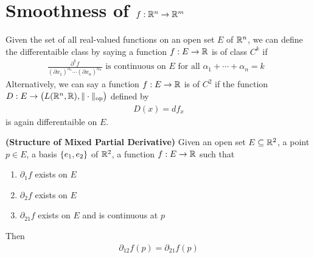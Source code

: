 \documentclass{report}
\begin{document}
\section{Smoothness of $f:\mathbb{R}^n\rightarrow \mathbb{R}^m$}
\begin{mdframed}
Given the set of all real-valued functions on an open set $E$ of $\mathbb{R}^n$, we can define the differentaible class by saying a function $f:E\rightarrow \mathbb{R}$ is of class $C^k$ if 
\begin{align*}
\frac{\partial^kf}{(\partial x_1)^{\alpha_1}\cdots (\partial x_n)^{\alpha_n}}\text{ is continuous on $E$ for all $\alpha_1+\cdots + \alpha_n=k$  }
\end{align*}
Alternatively, we can say a function $f:E\rightarrow \mathbb{R}$ is of $C^2$ if the function $D:E\rightarrow \big(L(\mathbb{R}^n,\mathbb{R}),\| \cdot \|_\text{op} \big)$ defined by 
 \begin{align*}
D(x)=df_x
\end{align*}
is again differentaible on $E$. 
\end{mdframed}
\begin{theorem}
\label{SoMPD}
\textbf{(Structure of Mixed Partial Derivative)} Given an open set $E\subseteq \mathbb{R}^2$, a point $p\in  E$, a basis $\{ e_1,e_2 \}$ of $\mathbb{R}^2$, a function $f:E\rightarrow \mathbb{R}$ such that 
\begin{enumerate}[label=(\alph*)]
  \item $\partial_1 f$ exists on $E$
   \item $\partial_2 f$ exists on $E$
     \item $\partial_{21} f$ exists on $E$ and is continuous at $p$
\end{enumerate}
Then 
\begin{align*}
\partial_{12} f(p)=\partial_{21}f(p)
\end{align*}
\end{theorem}
\end{document}
